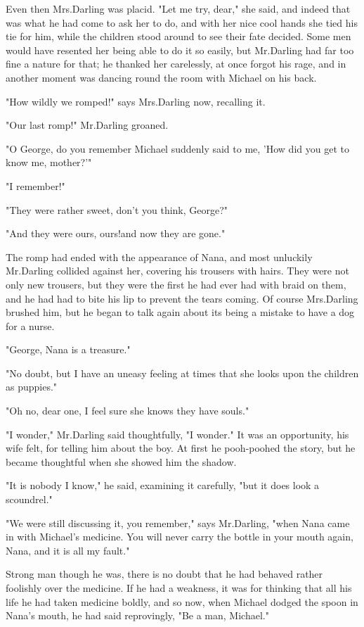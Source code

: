 Even then Mrs.\@ Darling was placid.
"Let me try, dear," she said,
and indeed that was what he had come to ask her to do,
and with her nice cool hands she tied his tie for him,
while the children stood around to see their fate decided.
Some men would have resented her being able to do it so easily,
but Mr.\@ Darling had far too fine a nature for that;
he thanked her carelessly, at once forgot his rage,
and in another moment was dancing round the room with Michael on his back.

"How wildly we romped!\@" says Mrs.\@ Darling now, recalling it.

"Our last romp!\@" Mr.\@ Darling groaned.

"O George, do you remember Michael suddenly said to me,
'How did you get to know me, mother?'"

"I remember!"

"They were rather sweet, don't you think, George?"

"And they were ours, ours!\@ and now they are gone."

The romp had ended with the appearance of Nana,
and most unluckily Mr.\@ Darling collided against her,
covering his trousers with hairs.
They were not only new trousers,
but they were the first he had ever had with braid on them,
and he had had to bite his lip to prevent the tears coming.
Of course Mrs.\@ Darling brushed him,
but he began to talk again about its being a mistake to have a dog for a nurse.

"George, Nana is a treasure."

"No doubt, but I have an uneasy feeling at times that she looks upon the children as puppies."

"Oh no, dear one, I feel sure she knows they have souls."

"I wonder," Mr.\@ Darling said thoughtfully, "I wonder."
It was an opportunity, his wife felt, for telling him about the boy.
At first he pooh-poohed the story, but he became thoughtful when she showed him the shadow.

"It is nobody I know," he said, examining it carefully, "but it does look a scoundrel."

"We were still discussing it, you remember," says Mr.\@ Darling, "when Nana came in with Michael's medicine.
You will never carry the bottle in your mouth again, Nana, and it is all my fault."

Strong man though he was, there is no doubt that he had behaved rather foolishly over the medicine.
If he had a weakness, it was for thinking that all his life he had taken medicine boldly,
and so now, when Michael dodged the spoon in Nana's mouth, he had said reprovingly, "Be a man, Michael."

